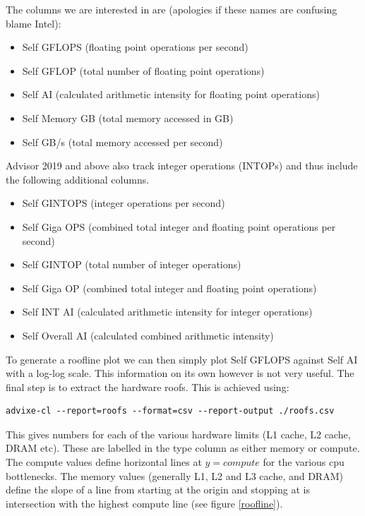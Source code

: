 \documentclass[a4paper, 11pt]{article}
\begin{document}
The columns we are interested in are (apologies if these names are confusing blame Intel):
\begin{itemize}
\item Self GFLOPS (floating point operations per second)
\item Self GFLOP (total number of floating point operations) 
\item Self AI (calculated arithmetic intensity for floating point operations) 
\item Self Memory GB (total memory accessed in GB)
\item Self GB/s (total memory accessed per second)
\end{itemize}

Advisor 2019 and above also track integer operations (INTOPs) and thus include the following additional columns.

\begin{itemize}
\item Self GINTOPS (integer operations per second)
\item Self Giga OPS (combined total integer and floating point operations per second)
\item  Self GINTOP (total number of integer operations)
\item Self Giga OP (combined total integer and floating point operations)
\item Self INT AI (calculated arithmetic intensity for integer operations)
\item Self Overall AI (calculated combined arithmetic intensity)
\end{itemize}

To generate a roofline plot we can then simply plot Self GFLOPS against Self AI with a log-log scale. This information on its own however is not very useful. The final step is to extract the hardware roofs. This is achieved using:
 \begin{verbatim}
advixe-cl --report=roofs --format=csv --report-output ./roofs.csv
\end{verbatim}
This gives numbers for each of the various hardware limits (L1 cache, L2 cache, DRAM etc). These are labelled in the type column as either memory or compute. The compute values define horizontal lines at $y=compute$ for the various cpu bottlenecks. The memory values (generally L1, L2 and L3 cache, and DRAM) define the slope of a line from starting at the origin and stopping at is intersection with the highest compute line (see figure \ref{roofline}). 
\end{document}
